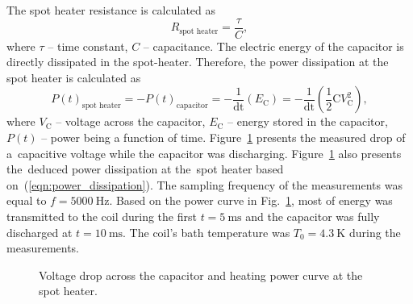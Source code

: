 The spot heater resistance is calculated as
\begin{equation}
    R_\text{spot heater} = \frac{\tau}{C},
\end{equation}
where $\tau$ -- time constant, $C$ -- capacitance. The electric energy of the capacitor is directly dissipated in the spot-heater. Therefore, the power dissipation at the spot heater is calculated as
\begin{equation}
    P(t)_\text{spot heater} = -P(t)_\text{capacitor} = -\frac{1}{\text{dt}} (E_\text{C}) = -\frac{1}{\text{dt}} (\frac{1}{2} \text{C}V_\text{C}^2),
    \label{eqn:power_dissipation}
\end{equation}
where $V_\text{C}$ -- voltage across the capacitor, $E_\text{C}$ -- energy stored in the capacitor, $P(t)$ -- power being a function of time. Figure~\ref{fig:capacitor_discharge} presents the measured drop of a~capacitive voltage while the capacitor was discharging. Figure~\ref{fig:capacitor_discharge} also presents the~deduced power dissipation at the~spot heater based on~(\ref{eqn:power_dissipation}). The sampling frequency of the measurements was equal to $f=5000~\text{Hz}$. Based on the power curve in Fig.~\ref{fig:capacitor_discharge}, most of energy was transmitted to the coil during the first $t=5~\text{ms}$ and the capacitor was fully discharged at $t=10~\text{ms}$. The coil's bath temperature was $T_0=4.3~\text{K}$ during the measurements.

\begin{figure}[H]
\centering
{}
\caption{Voltage drop across the capacitor and heating power curve at the spot heater.}
\label{fig:capacitor_discharge}
\end{figure}

